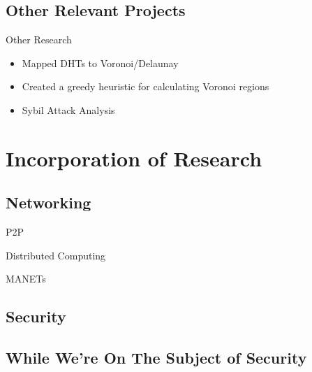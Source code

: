 \documentclass[11pt]{beamer}
\begin{document}
\subsection{Other Relevant Projects}
\begin{frame}{Other Research}
	\begin{itemize}
		\item Mapped DHTs to Voronoi/Delaunay
		\item Created a greedy heuristic for calculating Voronoi regions
		\item Sybil Attack Analysis
	\end{itemize}
\end{frame}

\section{Incorporation of Research}

\subsection{Networking}

\begin{frame}{P2P}
	
\end{frame}

\begin{frame}{Distributed Computing}
	
\end{frame}


\begin{frame}{MANETs}

\end{frame}

\subsection{Security}

\subsection{While We're On The Subject of Security}
\end{document}
